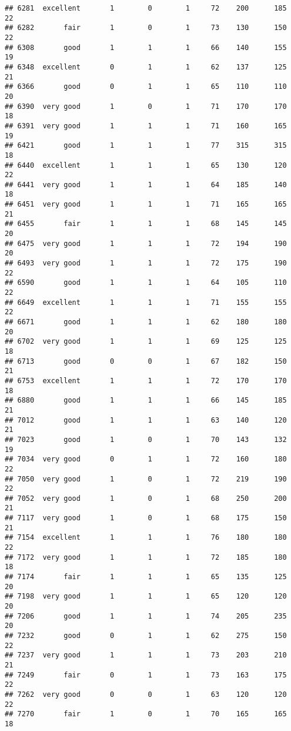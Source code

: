 \documentclass[]{article}
\begin{document}
\begin{verbatim}
## 6281  excellent       1        0        1     72    200      185  22
## 6282       fair       1        0        1     73    130      150  22
## 6308       good       1        1        1     66    140      155  19
## 6348  excellent       0        1        1     62    137      125  21
## 6366       good       0        1        1     65    110      110  20
## 6390  very good       1        0        1     71    170      170  18
## 6391  very good       1        1        1     71    160      165  19
## 6421       good       1        1        1     77    315      315  18
## 6440  excellent       1        1        1     65    130      120  22
## 6441  very good       1        1        1     64    185      140  18
## 6451  very good       1        1        1     71    165      165  21
## 6455       fair       1        1        1     68    145      145  20
## 6475  very good       1        1        1     72    194      190  20
## 6493  very good       1        1        1     72    175      190  22
## 6590       good       1        1        1     64    105      110  22
## 6649  excellent       1        1        1     71    155      155  22
## 6671       good       1        1        1     62    180      180  20
## 6702  very good       1        1        1     69    125      125  18
## 6713       good       0        0        1     67    182      150  21
## 6753  excellent       1        1        1     72    170      170  18
## 6880       good       1        1        1     66    145      185  21
## 7012       good       1        1        1     63    140      120  21
## 7023       good       1        0        1     70    143      132  19
## 7034  very good       0        1        1     72    160      180  22
## 7050  very good       1        0        1     72    219      190  22
## 7052  very good       1        0        1     68    250      200  21
## 7117  very good       1        0        1     68    175      150  21
## 7154  excellent       1        1        1     76    180      180  22
## 7172  very good       1        1        1     72    185      180  18
## 7174       fair       1        1        1     65    135      125  20
## 7198  very good       1        1        1     65    120      120  20
## 7206       good       1        1        1     74    205      235  20
## 7232       good       0        1        1     62    275      150  22
## 7237  very good       1        1        1     73    203      210  21
## 7249       fair       0        1        1     73    163      175  22
## 7262  very good       0        0        1     63    120      120  22
## 7270       fair       1        0        1     70    165      165  18

\end{verbatim}
\end{document}
